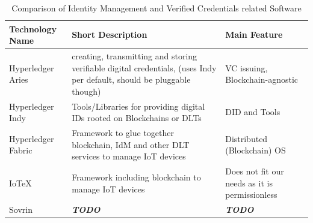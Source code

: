 \begin{table}
	\caption{Comparison of Identity Management and Verified Credentials related Software}
	\label{tab:Comparison of Identity Management and Verified Credentials related Software}
	\begin{center}
		\begin{tabular}[c]{|l|p{6cm}|p{6cm}|}
			\hline
			\textbf{Technology Name}                                                                &
			Short Description                                                                       &
			Main Feature                                                                              \\
			\hline
			Hyperledger Aries \cite{hyperledger:wiki}                                               &
			creating, transmitting and storing verifiable digital credentials, (uses Indy per default,
			should be pluggable though)                                                             &
			VC issuing, Blockchain-agnostic                                                           \\
			\hline
			Hyperledger Indy \cite{hyperledger:wiki}                                                &
			Tools/Libraries for providing digital IDs rooted on Blockchains or DLTs                 &
			DID and Tools                                                                             \\
			\hline
			Hyperledger Fabric \cite{hyperledger:fabric:docs}                                       &
			Framework to glue together blockchain, IdM and other DLT services to manage IoT devices &
			Distributed (Blockchain) OS                                                               \\
			\hline
			IoTeX \cite{iotex-bc-platform}                                                          &
			Framework including blockchain to manage IoT devices                                    &
			Does not fit our needs as it is permissionless                                            \\
			\hline
			Sovrin                                                                                  &
			\textbf{\textit{TODO}}                                                                  &
			\textbf{\textit{TODO}}                                                                    \\
			\hline
		\end{tabular}
	\end{center}
\end{table}

